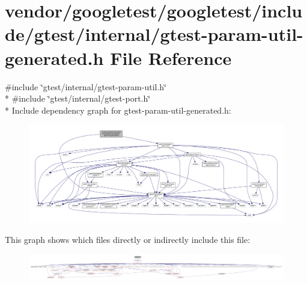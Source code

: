 \hypertarget{gtest-param-util-generated_8h}{}\section{vendor/googletest/googletest/include/gtest/internal/gtest-\/param-\/util-\/generated.h File Reference}
\label{gtest-param-util-generated_8h}
{\ttfamily \#include \char`\"{}gtest/internal/gtest-\/param-\/util.\+h\char`\"{}}\\*
{\ttfamily \#include \char`\"{}gtest/internal/gtest-\/port.\+h\char`\"{}}\\*
Include dependency graph for gtest-\/param-\/util-\/generated.h\+:
\nopagebreak
\begin{figure}[H]
\begin{center}
\leavevmode
\includegraphics[width=350pt]{gtest-param-util-generated_8h__incl}
\end{center}
\end{figure}
This graph shows which files directly or indirectly include this file\+:
\nopagebreak
\begin{figure}[H]
\begin{center}
\leavevmode
\includegraphics[width=350pt]{gtest-param-util-generated_8h__dep__incl}
\end{center}
\end{figure}
